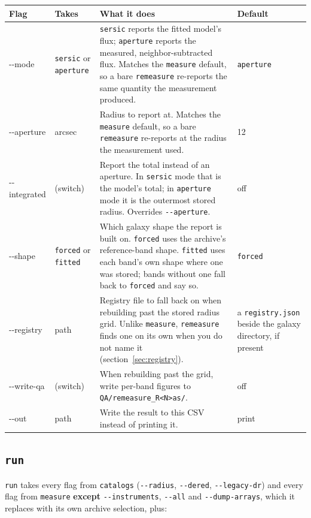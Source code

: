 \documentclass[11pt]{article}
\begin{document}
\begin{longtable}{T{2.9cm} L{2.15cm} L{6.45cm} L{2.7cm}}
\toprule
\textbf{\normalfont Flag} & \textbf{Takes} & \textbf{What it does} & \textbf{Default} \\
\midrule
\endhead
-{}-mode & \texttt{sersic} or \texttt{aperture} & \texttt{sersic} reports
  the fitted model's flux; \texttt{aperture} reports the measured,
  neighbor-subtracted flux. Matches the \texttt{measure} default, so a bare
  \texttt{remeasure} re-reports the same quantity the measurement produced.
  & \texttt{aperture} \\[2pt]
-{}-aperture & arcsec & Radius to report at. Matches the
  \texttt{measure} default, so a bare \texttt{remeasure} re-reports at the
  radius the measurement used. & 12 \\[2pt]
-{}-integrated & (switch) & Report the total instead of an aperture. In
  \texttt{sersic} mode that is the model's total; in \texttt{aperture}
  mode it is the outermost stored radius. Overrides
  \texttt{-{}-aperture}. & off \\[2pt]
-{}-shape & \texttt{forced} or \texttt{fitted} & Which galaxy shape the
  report is built on. \texttt{forced} uses the archive's reference-band
  shape. \texttt{fitted} uses each band's own shape where one was stored;
  bands without one fall back to \texttt{forced} and say so. &
  \texttt{forced} \\[2pt]
-{}-registry & path & Registry file to fall back on when rebuilding past
  the stored radius grid. Unlike \texttt{measure}, \texttt{remeasure}
  finds one on its own when you do not name it
  (section~\ref{sec:registry}). & a
  \texttt{registry.json} beside the galaxy directory, if present
  \\[2pt]
-{}-write-qa & (switch) & When rebuilding past the grid, write per-band
  figures to \texttt{QA/remeasure\_R<N>as/}. & off \\[2pt]
-{}-out & path & Write the result to this CSV instead of printing it. &
  print \\
\bottomrule
\end{longtable}

\subsection{\texttt{run}}

\texttt{run} takes every flag from \texttt{catalogs}
(\texttt{-{}-radius}, \texttt{-{}-dered}, \texttt{-{}-legacy-dr}) and
every flag from \texttt{measure} \textbf{except}
\texttt{-{}-instruments}, \texttt{-{}-all} and
\texttt{-{}-dump-arrays}, which it replaces with its own archive
selection, plus:
\end{document}
